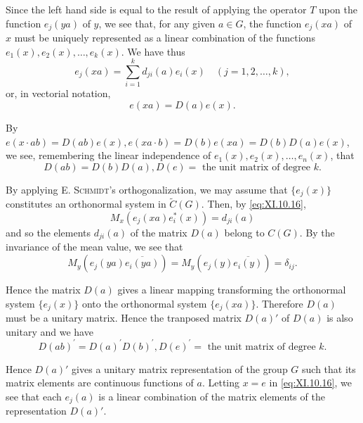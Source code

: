 Since the left hand side is equal to the result of applying the operator $T$ upon the function $e_j(ya)$ of $y$, we see that, for any given $a \in G$, the function $e_j(xa)$ of $x$ must be uniquely represented as a linear combination of the functions $e_1(x), e_2(x), \ldots, e_k(x)$. We have thus 
\begin{equation}\label{eq:XI.10.16}
e _{j} (x a) = \sum\limits_{i=1} ^{k} d _{ji} (a) e _{i} (x) \quad (j = 1, 2, \dots , k),
\end{equation}
or, in vectorial notation, 
\begin{equation}\tag{16'}\label{eq:XI.10.16'}
e (x a) = D (a) e (x).
\end{equation}

By $e(x \cdot ab) = D(ab)e(x), e(xa \cdot b) = D(b)e(xa) = D(b)D(a)e(x)$, we see, remembering the linear independence of $e_1(x), e_2(x), \ldots, e_n(x)$, that 
\begin{equation}\label{eq:XI.10.17}
D (a b) = D (b) D (a), D (e) = \text{ the unit matrix of degree } k.
\end{equation}

By applying E. \textsc{Schmidt}'s orthogonalization, we may assume that $\{e_j(x)\}$ constitutes an orthonormal system in $\tilde{C}(G)$. Then, by \eqref{eq:XI.10.16}, 
\begin{equation}\label{eq:XI.10.18}
M _{x} (e _{j} (x a) e _{i} ^{*} (x)) = d _{ji} (a)
\end{equation}
and so the elements $d_{ji}(a)$ of the matrix $D(a)$ belong to $C(G)$. By the invariance of the mean value, we see that 
\[
M _{y} \left(e _{j} (y a) \overline {{e _{i} (y a)}}\right) = M _{y} \left(e _{j} (y) \overline {{e _{i} (y)}}\right) = \delta_{ij}.
\]

Hence the matrix $D(a)$ gives a linear mapping transforming the orthonormal system $\{e_j(x)\}$ onto the orthonormal system $\{e_j(xa)\}$. Therefore $D(a)$ must be a unitary matrix. Hence the tranposed matrix $D(a)'$ of $D(a)$ is also unitary and we have 
\begin{equation}\tag{17'}\label{eq:XI.10.17prime}
D (a b) ^{\prime} = D (a) ^{\prime} D (b) ^{\prime}, D (e) ^{\prime} = \text{ the unit matrix of degree } k.
\end{equation}

Hence $D(a)'$ gives a unitary matrix representation of the group $G$ such that its matrix elements are continuous functions of $a$. Letting $x = e$ in \eqref{eq:XI.10.16}, we see that each $e_j(a)$ is a linear combination of the matrix elements of the representation $D(a)'$. 

